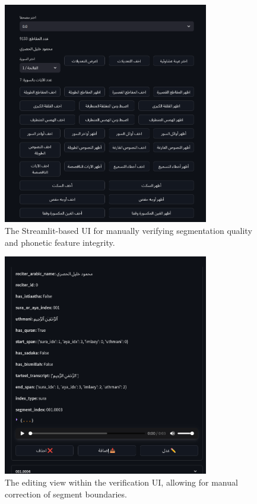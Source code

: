 \begin{figure}[H]
\centering
\includegraphics[width=0.8\textwidth]{../figures/data_verfication_ui.png}
\caption{The Streamlit-based UI for manually verifying segmentation quality and phonetic feature integrity.}
\label{fig:verification_ui}
\end{figure}

\begin{figure}[H]
\centering
\includegraphics[width=0.8\textwidth]{../figures/data_annotation_ui_editing.png}
\caption{The editing view within the verification UI, allowing for manual correction of segment boundaries.}
\label{fig:annotation_ui}
\end{figure}

